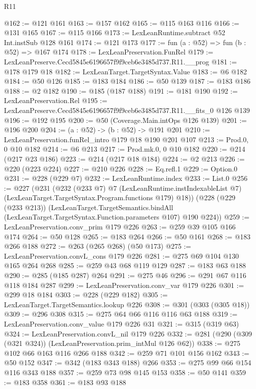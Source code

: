 \begin{lexlean}{R11}
\begin{coremodule}
@162 := @121 @161
@163 := @157 @162
@165 := @115 @163 @116
@166 := @131 @165
@167 := @115 @166
@173 := LexLeanRuntime.subtract @52 Int.instSub @128 @161
@174 := @121 @173
@177 := fun (a : @52) => fun (b : @52) => @167 @174
@178 := LexLeanPreservation.FunRel
@179 := LexLeanPreserve.Cecd5845e6196657f9f9ceb6e3485d737.R11.__prog
@181 := @178 @179 @18
@182 := LexLeanTarget.TargetSyntax.Value
@183 := @6 @182
@184 := @50 @126
@185 := @183 @184
@186 := @50 @139
@187 := @183 @186
@188 := @2 @182
@190 := @185 (@187 @188)
@191 := @181 @190
@192 := LexLeanPreservation.Rel
@195 := LexLeanPreserve.Cecd5845e6196657f9f9ceb6e3485d737.R11.__fits_0 @126 @139
@196 := @192 @195
@200 := @50 (Coverage.Main.intOps @126 @139)
@201 := @196 @200
@204 := (a : @52) -> (b : @52) -> @191 @201
@210 := LexLeanPreservation.funRel_intro @179 @18 @190 @201 @107
@213 := Prod.{0, 0} @10 @182
@214 := @6 @213
@217 := Prod.mk.{0, 0} @10 @182
@220 := @214 (@217 @23 @186)
@223 := @214 (@217 @18 @184)
@224 := @2 @213
@226 := @220 (@223 @224)
@227 := @210 @226
@228 := Eq.refl.{1}
@229 := Option.{0}
@231 := @228 (@229 @7)
@232 := LexLeanRuntime.index
@233 := List.{0}
@256 := @227
    (@231
      (@232
        (@233 @7)
        @7
        (LexLeanRuntime.instIndexableList @7)
        (LexLeanTarget.TargetSyntax.Program.functions @179)
        @18))
    (@228
      (@229 (@233 @213))
      (LexLeanTarget.TargetSemantics.bindAll
        (LexLeanTarget.TargetSyntax.Function.parameters @107)
        @190
        @224))
@259 := LexLeanPreservation.conv_prim @179 @226
@263 := @259 @39 @105 @166 @174
@264 := @50 @128
@265 := @183 @264
@266 := @50 @161
@268 := @183 @266 @188
@272 := @263 (@265 @268) (@50 @173)
@275 := LexLeanPreservation.convL_cons @179 @226
@281 := @275 @69 @104 @130 @165 @264 @268
@285 := @259 @43 @68 @119 @129
@287 := @183 @63 @188
@290 := @285 (@185 @287) @264
@291 := @275 @46
@296 := @291 @67 @116 @118 @184 @287
@299 := LexLeanPreservation.conv_var @179 @226
@301 := @299 @18 @184
@303 := @228 (@229 @182)
@305 := LexLeanTarget.TargetSemantics.lookup @226
@308 := @301 (@303 (@305 @18))
@309 := @296 @308
@315 := @275 @64 @66 @116 @116 @63 @188
@319 := LexLeanPreservation.conv_value @179 @226 @31
@321 := @315 (@319 @63)
@324 := LexLeanPreservation.convL_nil @179 @226
@332 := @281 (@290 (@309 (@321 @324)) (LexLeanPreservation.prim_intMul @126 @62))
@338 := @275 @102 @66 @163 @116 @266 @188
@342 := @259 @71 @101 @156 @162
@343 := @50 @152
@347 := @342 (@183 @343 @188) @266
@353 := @275 @99 @66 @154 @116 @343 @188
@357 := @259 @73 @98 @145 @153
@358 := @50 @141
@359 := @183 @358
@361 := @183 @93 @188

\end{coremodule}
\end{lexlean}
